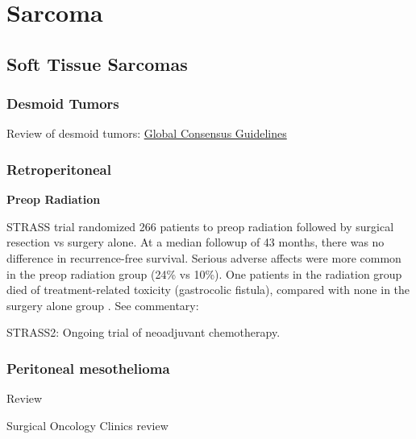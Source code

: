 \documentclass[
]{book}
\begin{document}
\hypertarget{part-sarcoma}{%
\part*{Sarcoma}\label{part-sarcoma}}

\hypertarget{soft-tissue-sarcomas}{%
\chapter{Soft Tissue Sarcomas}\label{soft-tissue-sarcomas}}

\hypertarget{desmoid-tumors}{%
\section{Desmoid Tumors}\label{desmoid-tumors}}

Review of desmoid tumors: \href{https://www.ejcancer.com/article/S0959-8049(19)30832-9/fulltext}{Global Consensus Guidelines}

\hypertarget{retroperitoneal}{%
\section{Retroperitoneal}\label{retroperitoneal}}

\textbf{Preop Radiation}

STRASS trial randomized 266 patients to preop radiation followed by surgical resection vs surgery alone. At a median followup of 43 months, there was no difference in recurrence-free survival. Serious adverse affects were more common in the preop radiation group (24\% vs 10\%). One patients in the radiation group died of treatment-related toxicity (gastrocolic fistula), compared with none in the surgery alone group \citep{bonvalot1366}. See commentary: \citep{cardona1257}

STRASS2: Ongoing trial of neoadjuvant chemotherapy.

\hypertarget{peritoneal-mesothelioma}{%
\section{Peritoneal mesothelioma}\label{peritoneal-mesothelioma}}

Review \citep{bridda32}

Surgical Oncology Clinics review \citep{li539}

  
\end{document}
